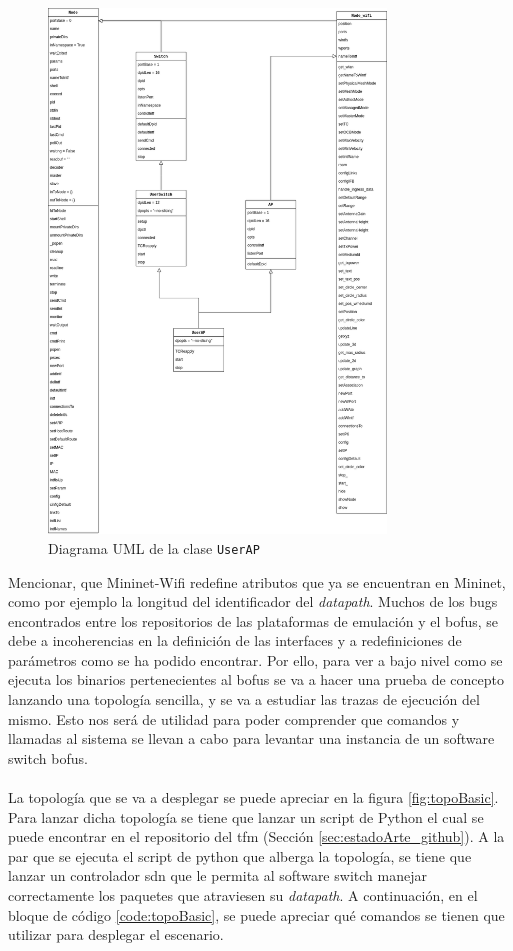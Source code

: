 \begin{figure}[ht!]
    \centering
    \includegraphics[width=0.8\textwidth]{archivos/img/analisis/userAP.png}
    \caption{Diagrama UML de la clase \texttt{UserAP}}
    \label{fig:userAP}
\end{figure}

Mencionar, que Mininet-Wifi redefine atributos que ya se encuentran en Mininet, como por ejemplo la longitud del identificador del \textit{datapath}. Muchos de los bugs encontrados entre los repositorios de las plataformas de emulación y el \gls{bofus}, se debe a incoherencias en la definición de las interfaces y a redefiniciones de parámetros como se ha podido encontrar. Por ello, para ver a bajo nivel como se ejecuta los binarios pertenecientes al \gls{bofus} se va a hacer una prueba de concepto lanzando una topología sencilla, y se va a estudiar las trazas de ejecución del mismo. Esto nos será de utilidad para poder comprender que comandos y llamadas al sistema se llevan a cabo para levantar una instancia de un software switch \gls{bofus}.\\
\\
La topología que se va a desplegar se puede apreciar en la figura \ref{fig:topoBasic}. Para lanzar dicha topología se tiene que lanzar un script de Python el cual se puede encontrar en el repositorio del \gls{tfm} (Sección \ref{sec:estadoArte_github}). A la par que se ejecuta el script de python que alberga la topología, se tiene que lanzar un controlador \gls{sdn} que le permita al software switch manejar correctamente los paquetes que atraviesen su \textit{datapath}. A continuación, en el bloque de código \ref{code:topoBasic}, se puede apreciar qué comandos se tienen que utilizar para  desplegar el escenario. \\

